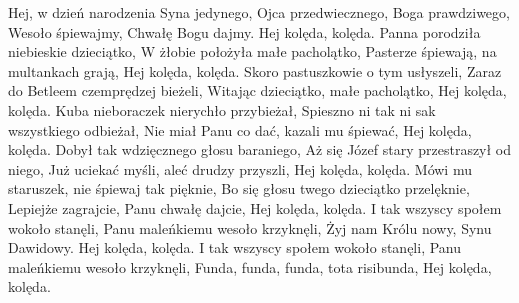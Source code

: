 \beginverse
Hej, w dzień narodzenia Syna jedynego,
Ojca przedwiecznego, Boga prawdziwego,
Wesoło śpiewajmy, Chwałę Bogu dajmy.
Hej kolęda, kolęda.
\endverse
\beginverse
Panna porodziła niebieskie dzieciątko,
W żłobie położyła małe pacholątko,
Pasterze śpiewają, na multankach grają,
Hej kolęda, kolęda.
\endverse
\beginverse
Skoro pastuszkowie o tym usłyszeli,
Zaraz do Betleem czemprędzej bieżeli,
Witając dzieciątko, małe pacholątko,
Hej kolęda, kolęda.
\endverse
\beginverse
Kuba nieboraczek nierychło przybieżał,
Spieszno ni tak ni sak wszystkiego odbieżał,
Nie miał Panu co dać, kazali mu śpiewać,
Hej kolęda, kolęda.
\endverse
\beginverse
Dobył tak wdzięcznego głosu baraniego,
Aż się Józef stary przestraszył od niego,
Już uciekać myśli, aleć drudzy przyszli,
Hej kolęda, kolęda.
\endverse
\beginverse
Mówi mu staruszek, nie śpiewaj tak pięknie,
Bo się głosu twego dzieciątko przelęknie,
Lepiejże zagrajcie, Panu chwałę dajcie,
Hej kolęda, kolęda.
\endverse
\beginverse
I tak wszyscy społem wokoło stanęli,
Panu maleńkiemu wesoło krzyknęli,
Żyj nam Królu nowy, Synu Dawidowy.
Hej kolęda, kolęda.
\endverse
\beginverse
I tak wszyscy społem wokoło stanęli,
Panu maleńkiemu wesoło krzyknęli,
Funda, funda, funda, tota risibunda,
Hej kolęda, kolęda.
\endverse
\endsong